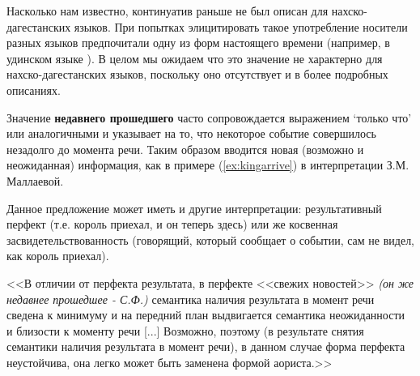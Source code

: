 
Насколько нам известно, континуатив раньше не был описан для нахско-дагестанских языков. При попытках элицитировать такое употребление носители разных языков предпочитали одну из форм настоящего времени (например, в удинском языке \citep{maisak2018}). В целом мы ожидаем что это значение не характерно для нахско-дагестанских языков, поскольку оно отсутствует и в более подробных описаниях. 
\par Значение \textbf{недавнего прошедшего} часто сопровождается выражением `только что’ или аналогичными и указывает на то, что некоторое событие совершилось незадолго до момента речи. Таким образом вводится новая (возможно и неожиданная) информация, как в примере (\ref{ex:kingarrive}) в интерпретации З.М. Маллаевой.


Данное предложение может иметь и другие интерпретации: результативный перфект (т.е. король приехал, и он теперь здесь) или же косвенная засвидетельствованность (говорящий, который сообщает о событии, сам не видел, как король приехал).

\begin{displayquote}
<<В отличии от перфекта результата, в перфекте <<свежих новостей>> \textit{(он же недавнее прошедшее - С.Ф.)} семантика наличия результата в момент речи сведена к минимуму и на передний план выдвигается семантика неожиданности и близости к моменту речи [...]
Возможно, поэтому (в результате снятия семантики наличия результата в момент речи), в данном случае форма перфекта неустойчива, она легко может быть заменена формой аориста.>>\\
\citep[205]{mallaeva2007}
\end{displayquote}

